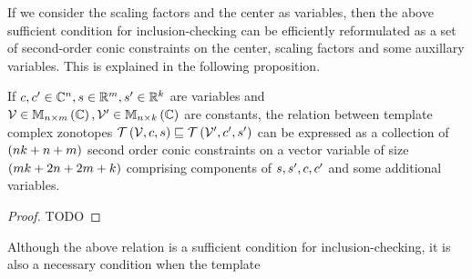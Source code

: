 %
If we consider the scaling factors and the center as variables, then
the above sufficient condition for inclusion-checking can be
efficiently reformulated as a set of second-order conic constraints on
the center, scaling factors and some auxillary variables.  This is
explained in the following proposition.
%
\begin{proposition}
If
$c,c^\prime\in\mathbb{C}^n,s\in\mathbb{R}^m,s^\prime\in\mathbb{R}^k$
are variables and\\
$\mathcal{V}\in\mathbb{M}_{n\times m}\left(\mathbb{C}\right),\mathcal{V}^\prime\in\mathbb{M}_{n\times k}\left(\mathbb{C}\right)$
are constants, the relation between template complex zonotopes
$\mathit{\mathcal{T}}\left(\mathcal{V},c,s\right)\sqsubseteq\mathit{\mathcal{T}}\left(\mathcal{V}^\prime,c^\prime,s^\prime\right)$
can be expressed as a collection of $\left(nk+n+m\right)$ second order
conic constraints on a vector variable of size \\$\left(mk+2n+2m+k\right)$
comprising components of $s,s^\prime,c,c^\prime$ and some
additional variables.
\end{proposition}
%
\begin{proof}
{\color{red} TODO}
\end{proof}
%
Although the above relation is a sufficient condition for
inclusion-checking, it is also a necessary condition when the template
